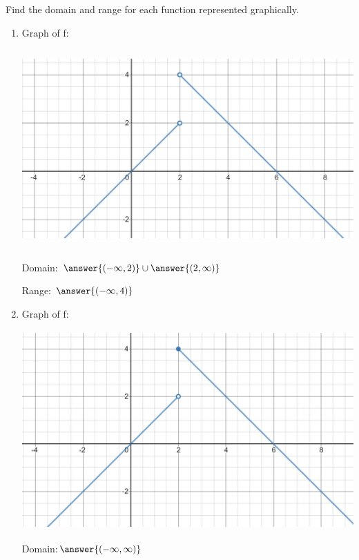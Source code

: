 \documentclass{ximera}
\begin{document}
\begin{problem}\label{prob:160hom2prob3}
Find the domain and range for each function represented graphically.
\begin{enumerate}
    \item Graph of f:
     \begin{image}
   \includegraphics[height=3in]{160H2pic1.jpg}
 \end{image}
 
 Domain: $\answer{(-\infty,2)}\cup\answer{(2,\infty)}$
 
 Range:  $\answer{(-\infty,4)}$
 \item Graph of f:
     \begin{image}
   \includegraphics[height=3in]{160H2pic2.jpg}
 \end{image}
 
 Domain:$\answer{(-\infty,\infty)}$
 

\end{enumerate}
\end{problem}
\end{document}
